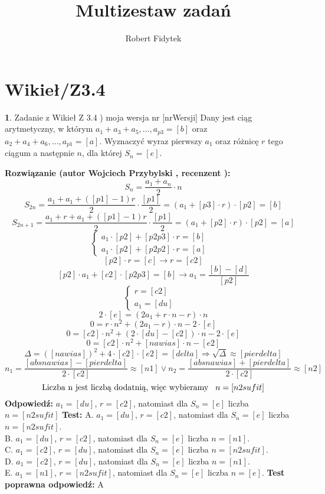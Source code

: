 \documentclass[12pt, a4paper]{article}
\title{Multizestaw zadań}
\author{Robert Fidytek}
\date{}
\theoremstyle{definition} %
\newtheorem{zad}{}
\newcommand{\kategoria}[1]{\section{#1}} %
\newcommand{\zadStart}[1]{\begin{zad}#1\newline} %
\newcommand{\zadStop}{\end{zad}}   %
\newcommand{\rozwStart}[2]{\noindent \textbf{Rozwiązanie (autor #1 , recenzent #2): }\newline} %
\newcommand{\rozwStop}{\newline}                                            %
\newcommand{\odpStart}{\noindent \textbf{Odpowiedź:}\newline}    %
\newcommand{\odpStop}{\newline}                                             %
\newcommand{\testStart}{\noindent \textbf{Test:}\newline} %
\newcommand{\testStop}{\newline} %
\newcommand{\kluczStart}{\noindent \textbf{Test poprawna odpowiedź:}\newline} %
\newcommand{\kluczStop}{\newline} %
\begin{document}
\maketitle


\kategoria{Wikieł/Z3.4}
\zadStart{Zadanie z Wikieł Z 3.4 ) moja wersja nr [nrWersji]}
Dany jest ciąg arytmetyczny, w którym $a_{1}+a_{3}+a_{5},\ldots,a_{p3}=[b]$ oraz $a_{2}+a_{4}+a_{6},\ldots,a_{p1}=[a]$. Wyznaczyć wyraz pierwszy $a_{1}$ oraz różnicę $r$ tego ciągum a następnie $n$, dla której $S_{n}=[e]$.
\zadStop
\rozwStart{Wojciech Przybylski}{}
$$S_{n}=\frac{a_{1}+a_{n}}{2}\cdot n $$
$$S_{2n}=\frac{a_{1}+a_{1}+([p1]-1)r}{2}\cdot \frac{[p1]}{2}=(a_{1}+[p3]\cdot r)\cdot[p2]=[b]$$
$$S_{2n+1}=\frac{a_{1}+r+a_{1}+([p1]-1)r}{2}\cdot \frac{[p1]}{2}=(a_{1}+[p2]\cdot r)\cdot[p2]=[a]$$
$$
 \left\{ \begin{array}{ll}
a_{1}\cdot [p2]+[p2p3]\cdot r=[b] & \\
a_{1}\cdot [p2]+[p2p2]\cdot r=[a] &
\end{array} \right.
$$
$$[p2]\cdot r=[c] \rightarrow r=[c2]$$
$$[p2]\cdot a_{1}+[c2]\cdot[p2p3]=[b] \rightarrow a_{1}=\frac{[b]-[d]}{[p2]}$$
$$
 \left\{ \begin{array}{ll}
r=[c2] & \\
a_{1}=[du] &
\end{array} \right.
$$
$$2\cdot [e]=(2a_{1}+r\cdot n-r)\cdot n$$
$$0=r\cdot n^{2}+ (2a_{1}-r)\cdot n-2\cdot[e]$$
$$0=[c2]\cdot n^{2}+(2\cdot[du]-[c2])\cdot n-2\cdot[e]$$
$$0=[c2]\cdot n^{2}+[nawias]\cdot n-[e2]$$
$$\Delta=([nawias])^{2}+4\cdot[c2]\cdot[e2]=[delta]\Rightarrow\sqrt{\Delta}\approx[pierdelta]$$
$$n_{1}=\frac{[absnawias]-[pierdelta]}{2\cdot[c2]}\approx[n1] \vee n_{2}=\frac{[absnawias]+[pierdelta]}{2\cdot[c2]}\approx[n2] $$
$$\mbox{Liczba n jest liczbą dodatnią, więc wybieramy}\hspace{3mm} n=[n2sufit]$$
\rozwStop
\odpStart
$a_{1}=[du]$, $r=[c2]$, natomiast dla $S_{n}=[e]$ liczba $n=[n2sufit]$
\odpStop
\testStart
A. $a_{1}=[du]$, $r=[c2]$, natomiast dla $S_{n}=[e]$ liczba $n=[n2sufit]$.\\
B. $a_{1}=[du]$, $r=[c2]$, natomiast dla $S_{n}=[e]$ liczba $n=[n1]$.\\
C. $a_{1}=[c2]$, $r=[du]$, natomiast dla $S_{n}=[e]$ liczba $n=[n2sufit]$.\\
D. $a_{1}=[c2]$, $r=[du]$, natomiast dla $S_{n}=[e]$ liczba $n=[n1]$.\\
E. $a_{1}=[n1]$, $r=[n2sufit]$, natomiast dla $S_{n}=[e]$ liczba $n=[e]$.
\testStop
\kluczStart
A
\kluczStop
\end{document}
